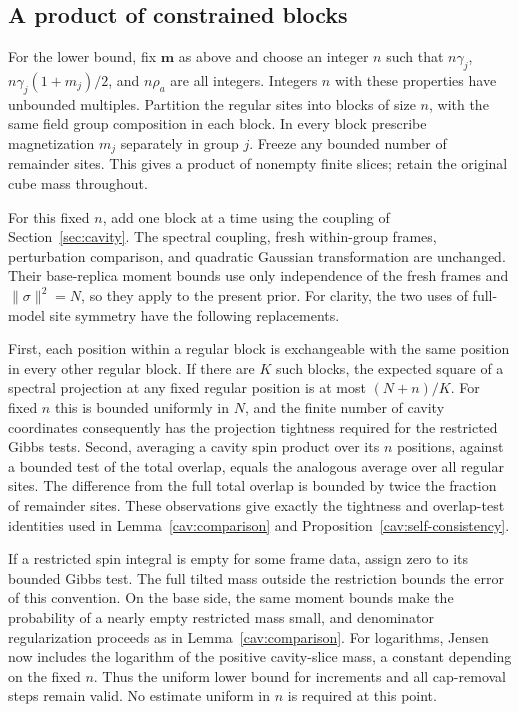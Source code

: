 \subsection{A product of constrained blocks}

For the lower bound, fix $\mathbf m$ as above and choose an integer $n$
such that $n\gamma_j$, $n\gamma_j(1+m_j)/2$, and $n\rho_a$ are all
integers. Integers $n$ with these properties have unbounded multiples.
Partition the regular sites into blocks of size $n$, with the same field
group composition in each block. In every block prescribe magnetization
$m_j$ separately in group $j$. Freeze any bounded number of remainder
sites. This gives a product of nonempty finite slices; retain the
original cube mass throughout.

For this fixed $n$, add one block at a time using the coupling of
Section~\ref{sec:cavity}. The spectral coupling, fresh within-group
frames, perturbation comparison, and quadratic Gaussian transformation
are unchanged. Their base-replica moment bounds use only independence of
the fresh frames and $\|\sigma\|^2=N$, so they apply to the present prior.
For clarity, the two uses of full-model site symmetry have the following
replacements.

First, each position within a regular block is exchangeable with the
same position in every other regular block. If there are $K$ such blocks,
the expected square of a spectral projection at any fixed regular
position is at most $(N+n)/K$. For fixed $n$ this is bounded uniformly
in $N$, and the finite number of cavity coordinates consequently has the
projection tightness required for the restricted Gibbs tests. Second,
averaging a cavity spin product over its $n$ positions, against a bounded
test of the total overlap, equals the analogous average over all regular
sites. The difference from the full total overlap is bounded by twice the
fraction of remainder sites. These observations give exactly the
tightness and overlap-test identities used in
Lemma~\ref{cav:comparison} and Proposition~\ref{cav:self-consistency}.

If a restricted spin integral is empty for some frame data, assign zero
to its bounded Gibbs test. The full tilted mass outside the restriction
bounds the error of this convention. On the base side, the same moment
bounds make the probability of a nearly empty restricted mass small,
and denominator regularization proceeds as in
Lemma~\ref{cav:comparison}. For logarithms, Jensen now includes the
logarithm of the positive cavity-slice mass, a constant depending on the
fixed $n$. Thus the uniform lower bound for increments and all cap-removal
steps remain valid. No estimate uniform in $n$ is required at this point.

